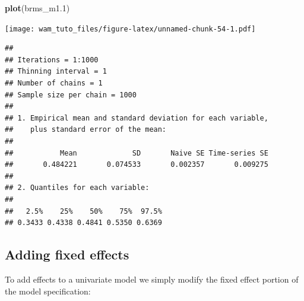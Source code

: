 \documentclass[
  12pt,
]{book}
\newenvironment{Shaded}{\begin{snugshade}}{\end{snugshade}}
\newcommand{\DataTypeTok}[1]{\textcolor[rgb]{0.13,0.29,0.53}{#1}}
\newcommand{\DecValTok}[1]{\textcolor[rgb]{0.00,0.00,0.81}{#1}}
\newcommand{\FloatTok}[1]{\textcolor[rgb]{0.00,0.00,0.81}{#1}}
\newcommand{\KeywordTok}[1]{\textcolor[rgb]{0.13,0.29,0.53}{\textbf{#1}}}
\newcommand{\NormalTok}[1]{#1}
\newcommand{\OperatorTok}[1]{\textcolor[rgb]{0.81,0.36,0.00}{\textbf{#1}}}
\newcommand{\OtherTok}[1]{\textcolor[rgb]{0.56,0.35,0.01}{#1}}
\newcommand{\StringTok}[1]{\textcolor[rgb]{0.31,0.60,0.02}{#1}}
\begin{document}
\begin{Shaded}
\begin{Highlighting}[]
\KeywordTok{plot}\NormalTok{(brms\_m1}\FloatTok{.1}\NormalTok{)}
\end{Highlighting}
\end{Shaded}

\texttt{[image: wam\_tuto\_files/figure-latex/unnamed-chunk-54-1.pdf]}

\begin{Shaded}
\end{Shaded}

\begin{verbatim}
## 
## Iterations = 1:1000
## Thinning interval = 1 
## Number of chains = 1 
## Sample size per chain = 1000 
## 
## 1. Empirical mean and standard deviation for each variable,
##    plus standard error of the mean:
## 
##           Mean             SD       Naive SE Time-series SE 
##       0.484221       0.074533       0.002357       0.009275 
## 
## 2. Quantiles for each variable:
## 
##   2.5%    25%    50%    75%  97.5% 
## 0.3433 0.4338 0.4841 0.5350 0.6369
\end{verbatim}

\hypertarget{adding-fixed-effects-2}{%
\subsection{Adding fixed effects}\label{adding-fixed-effects-2}}

To add effects to a univariate model we simply modify the fixed effect portion of the model specification:
\end{document}
